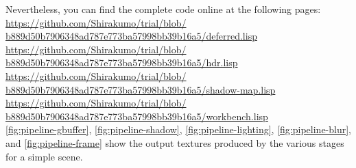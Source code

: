 \documentclass[format=sigconf]{acmart}
\begin{document}
Nevertheless, you can find the complete code online at the following pages: \\
\href{https://github.com/Shirakumo/trial/blob/b889d50b7906348ad787e773ba57998bb39b16a5/deferred.lisp}{https://github.com/Shirakumo/trial/blob/\\b889d50b7906348ad787e773ba57998bb39b16a5/deferred.lisp} \\
\href{https://github.com/Shirakumo/trial/blob/b889d50b7906348ad787e773ba57998bb39b16a5/hdr.lisp}{https://github.com/Shirakumo/trial/blob/\\b889d50b7906348ad787e773ba57998bb39b16a5/hdr.lisp} \\
\href{https://github.com/Shirakumo/trial/blob/b889d50b7906348ad787e773ba57998bb39b16a5/shadow-map.lisp}{https://github.com/Shirakumo/trial/blob/\\b889d50b7906348ad787e773ba57998bb39b16a5/shadow-map.lisp} \\
\href{https://github.com/Shirakumo/trial/blob/b889d50b7906348ad787e773ba57998bb39b16a5/workbench.lisp}{https://github.com/Shirakumo/trial/blob/\\b889d50b7906348ad787e773ba57998bb39b16a5/workbench.lisp} \\

\autoref{fig:pipeline-gbuffer}, \autoref{fig:pipeline-shadow}, \autoref{fig:pipeline-lighting}, \autoref{fig:pipeline-blur}, and \autoref{fig:pipeline-frame} show the output textures produced by the various stages for a simple scene.
\end{document}
